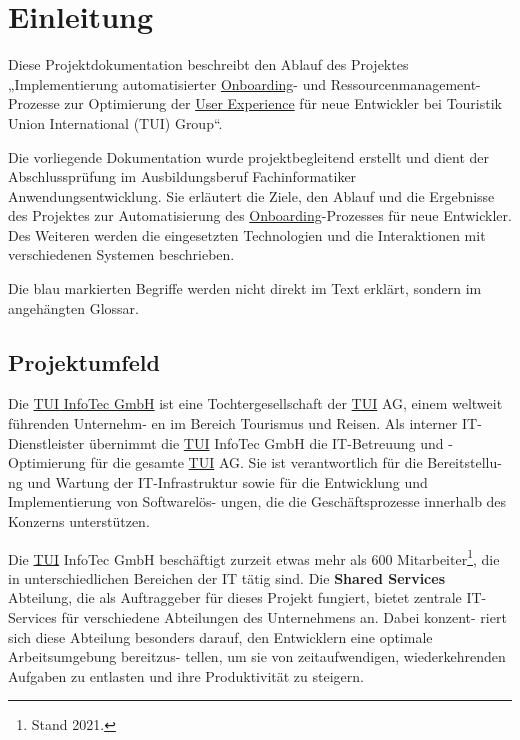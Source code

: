 \section{Einleitung}
\label{sec:Einleitung}

Diese Projektdokumentation beschreibt den Ablauf des Projektes „Implementierung automatisierter \hyperlink{Onboarding}{\textcolor{AOBlau}{Onboarding}}- und Ressourcenmanagement-Prozesse zur Optimierung der \hyperlink{UserExperience}{\textcolor{AOBlau}{User Experience}} für neue Entwickler bei Touristik Union International (TUI) Group“. 

Die vorliegende Dokumentation wurde projektbegleitend erstellt und dient der Abschlussprüfung im Ausbildungsberuf Fachinformatiker Anwendungsentwicklung. Sie erläutert die Ziele, den Ablauf und die Ergebnisse des Projektes zur Automatisierung des \hyperlink{Onboarding}{\textcolor{AOBlau}{Onboarding}}-Prozesses für neue Entwickler. Des Weiteren werden die eingesetzten Technologien und die Interaktionen mit verschiedenen Systemen beschrieben. 

Die \textcolor{AOBlau}{blau} markierten Begriffe werden nicht direkt im Text erklärt, sondern im angehängten Glossar.

\subsection{Projektumfeld} 
\label{sec:Projektumfeld}

Die \hyperlink{TUI}{\textcolor{AOBlau}{TUI} InfoTec GmbH} ist eine Tochtergesellschaft der \hyperlink{TUI}{\textcolor{AOBlau}{TUI}} AG, einem weltweit führenden Unternehm-
en im Bereich Tourismus und Reisen. Als interner IT-Dienstleister übernimmt die \hyperlink{TUI}{\textcolor{AOBlau}{TUI}} InfoTec GmbH die IT-Betreuung und -Optimierung für die gesamte \hyperlink{TUI}{\textcolor{AOBlau}{TUI}} AG. Sie ist verantwortlich für die Bereitstellu-
ng und Wartung der IT-Infrastruktur sowie für die Entwicklung und Implementierung von Softwarelös-
ungen, die die Geschäftsprozesse innerhalb des Konzerns unterstützen.

Die \hyperlink{TUI}{\textcolor{AOBlau}{TUI}} InfoTec GmbH beschäftigt zurzeit etwas mehr als 600 Mitarbeiter\footnote{Stand 2021.}, die in unterschiedlichen Bereichen der IT tätig sind. Die \textbf{Shared Services} Abteilung, die als Auftraggeber für dieses Projekt fungiert, bietet zentrale IT-Services für verschiedene Abteilungen des Unternehmens an. Dabei konzent-
riert sich diese Abteilung besonders darauf, den Entwicklern eine optimale Arbeitsumgebung bereitzus-
tellen, um sie von zeitaufwendigen, wiederkehrenden Aufgaben zu entlasten und ihre Produktivität zu steigern.

